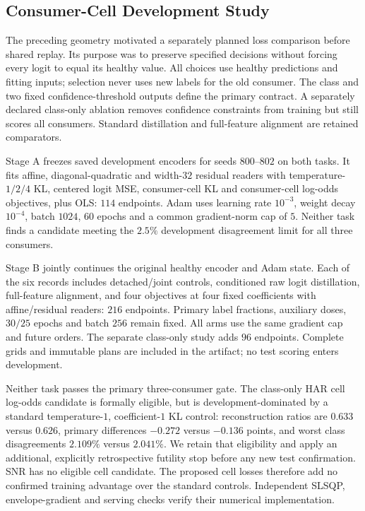 \subsection{Consumer-Cell Development Study}\label{app:consumer_cell_study}

The preceding geometry motivated a separately planned loss comparison
before shared replay. Its purpose was to preserve specified decisions
without forcing every logit to equal its healthy value. All choices use
healthy predictions and fitting inputs; selection never uses new labels
for the old consumer. The class and two fixed confidence-threshold outputs
define the primary contract. A separately declared class-only ablation
removes confidence constraints from training but still scores all consumers.
Standard distillation and full-feature alignment are retained comparators.

Stage A freezes saved development encoders for seeds $800$--$802$ on both
tasks. It fits affine, diagonal-quadratic and width-$32$ residual readers
with temperature-$1/2/4$ KL, centered logit MSE, consumer-cell KL and
consumer-cell log-odds objectives, plus OLS: $114$ endpoints. Adam uses
learning rate $10^{-3}$, weight decay $10^{-4}$, batch $1024$, $60$ epochs
and a common gradient-norm cap of $5$. Neither task finds a candidate
meeting the $2.5\%$ development disagreement limit for all three consumers.

Stage B jointly continues the original healthy encoder and Adam state.
Each of the six records includes detached/joint controls, conditioned raw
logit distillation, full-feature alignment, and four objectives at four
fixed coefficients with affine/residual readers: $216$ endpoints. Primary
label fractions, auxiliary doses, $30/25$ epochs and batch $256$ remain
fixed. All arms use the same gradient cap and future orders. The separate
class-only study adds $96$ endpoints. Complete grids and immutable plans
are included in the artifact; no test scoring enters development.

Neither task passes the primary three-consumer gate. The class-only HAR
cell log-odds candidate is formally eligible, but is development-dominated
by a standard temperature-$1$, coefficient-$1$ KL control: reconstruction
ratios are $0.633$ versus $0.626$, primary differences $-0.272$ versus
$-0.136$ points, and worst class disagreements $2.109\%$ versus $2.041\%$.
We retain that eligibility and apply an additional, explicitly retrospective
futility stop before any new test confirmation. SNR has no eligible cell
candidate. The proposed cell losses therefore add no confirmed training advantage
over the standard controls. Independent SLSQP, envelope-gradient and serving
checks verify their numerical implementation.
